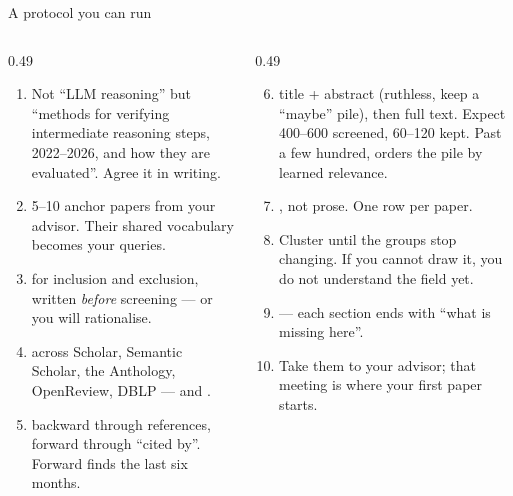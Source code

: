 \documentclass[aspectratio=169,11pt]{beamer}
\begin{document}
\begin{frame}{A protocol you can run}
\begin{columns}[T]
\begin{column}{0.49\textwidth}
\footnotesize
\begin{enumerate}
  \item {} Not ``LLM reasoning'' but ``methods for
        verifying intermediate reasoning steps, 2022--2026, and how they are
        evaluated''. Agree it in writing.
  \item {} 5--10 anchor papers from your advisor. Their shared
        vocabulary becomes your queries.
  \item {} for inclusion and exclusion, written \emph{before}
        screening --- or you will rationalise.
  \item {} across Scholar, Semantic Scholar, the
        Anthology, OpenReview, DBLP --- and .
  \item {} backward through references, forward through
        ``cited by''. Forward finds the last six months.
\end{enumerate}
\end{column}
\begin{column}{0.49\textwidth}
\footnotesize
\begin{enumerate}\setcounter{enumi}{5}
  \item {} title + abstract (ruthless, keep a
        ``maybe'' pile), then full text. Expect 400--600 screened, 60--120
        kept. Past a few hundred,  orders the pile by learned
        relevance.
  \item {}, not prose. One row per paper.
  \item {} Cluster until the groups stop changing. If
        you cannot draw it, you do not understand the field yet.
  \item {} --- each section ends with ``what is missing
        here''.
  \item {} Take them to your advisor; that meeting
        is where your first paper starts.
\end{enumerate}
\end{column}
\end{columns}
\end{frame}
\end{document}
